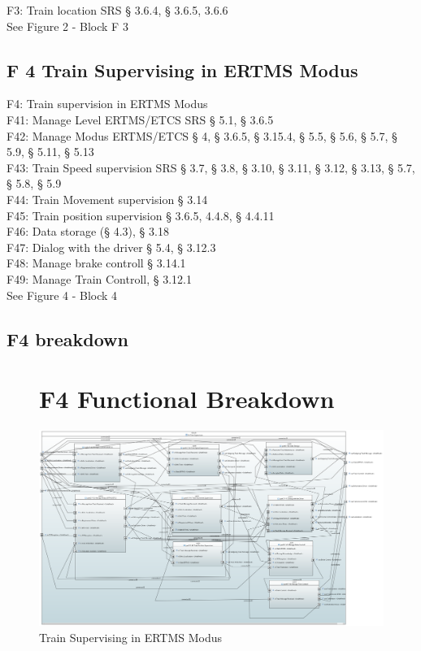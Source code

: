 \documentclass{template/openetcs_article}
\begin{document}
F3: Train location SRS § 3.6.4, § 3.6.5, 3.6.6\\
See Figure 2 - Block F 3\\

 \subsection{F 4 Train Supervising in ERTMS Modus}
F4: Train supervision in ERTMS Modus\\
F41: Manage Level ERTMS/ETCS SRS § 5.1, § 3.6.5\\
F42: Manage Modus ERTMS/ETCS § 4, § 3.6.5, § 3.15.4, § 5.5, § 5.6, § 5.7, § 5.9, § 5.11, § 5.13\\
F43: Train Speed supervision SRS § 3.7, § 3.8, § 3.10, § 3.11, § 3.12, § 3.13, § 5.7, § 5.8, § 5.9\\
F44: Train Movement supervision § 3.14\\
F45: Train position supervision § 3.6.5, 4.4.8, § 4.4.11\\
F46: Data storage (§ 4.3), § 3.18\\
F47: Dialog with the driver § 5.4, § 3.12.3\\
F48: Manage brake controll § 3.14.1\\ 
F49: Manage Train Controll, § 3.12.1\\
See Figure 4 - Block 4

 \subsection{F4 breakdown}	
 \begin{figure}[hbtp]
\section{F4 Functional Breakdown}
\centering
\includegraphics [angle=90, scale=0.35] {images/F4_Breakdown}
\caption{Train Supervising in ERTMS Modus}
\end{figure}
\end{document}
